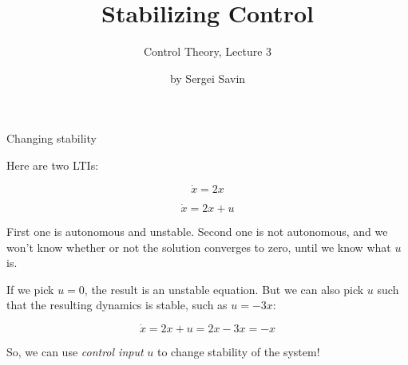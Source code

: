 \documentclass{beamer}
\title{Stabilizing Control}
\subtitle{Control Theory, Lecture 3}
\author{by Sergei Savin}
\date{\mydate}
\begin{document}
\maketitle


%
%



\begin{frame}{Changing stability}
\begin{flushleft}

Here are two LTIs:

\begin{equation}
    \dot{x} = 2 x
\end{equation}

\begin{equation}
    \dot{x} = 2 x + u
\end{equation}

First one is autonomous and unstable. Second one is not autonomous, and we won't know whether or not the solution converges to zero, until we know what $u$ is.

\bigskip

If we pick $u=0$, the result is an unstable equation. But we can also pick $u$ such that the resulting dynamics is stable, such as $u=-3x$:

\begin{equation}
    \dot{x} = 2 x + u = 2 x - 3x = -x
\end{equation}

\begin{block}{ }
So, we can use \emph{control input} $u$ to change stability of the system!
\end{block}


\end{flushleft}
\end{frame}
\end{document}
